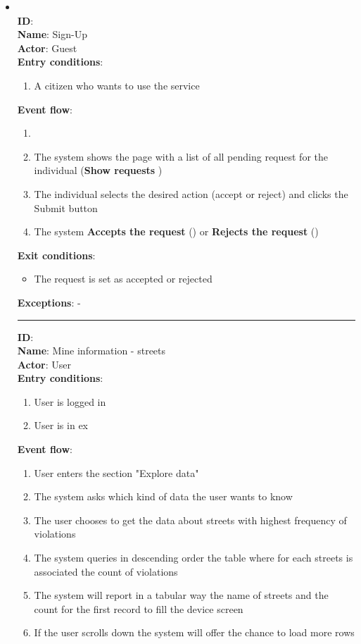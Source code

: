 \begin{enumerate}
\begin{itemize}
		\item{  } \\
		\textbf{ID}:  \\
		\textbf{Name}: Sign-Up \\
		\textbf{Actor}: Guest \\
		\textbf{Entry conditions}:
		\begin{enumerate}
			\item{A citizen who wants to use the service}
		\end{enumerate}
		\textbf{Event flow}:
		\begin{enumerate}
			\item{}
			\item{The system shows the page with a list of all pending request for the individual (\textbf{Show requests} )}
			\item{The individual selects the desired action (accept or reject) and clicks the Submit button}
			\item{The system \textbf{Accepts the request} () or \textbf{Rejects the request} ()}
		\end{enumerate}
		\textbf{Exit conditions}:
		\begin{itemize}
			\item{The request is set as accepted or rejected}
		\end{itemize}
		\textbf{Exceptions}: - \\
		\rule{\linewidth}{0.4pt}
		\textbf{ID}:  \\
		\textbf{Name}: Mine information - streets \\
		\textbf{Actor}: User  \\
		\textbf{Entry conditions}:
		\begin{enumerate}
			\item{User is logged in}
			\item{User is in ex}
		\end{enumerate}
		\textbf{Event flow}:
		\begin{enumerate}
			\item{User enters the section "Explore data"}
			\item{The system asks which kind of data the user wants to know}
      \item{The user chooses to get the data about streets with highest frequency of violations}
      \item{The system queries in descending order the table where for each streets is associated the count of violations }
      \item{The system will report in a tabular way the name of streets and the count for the first record to fill the device screen }
      \item{If the user scrolls down the system will offer the chance to load more rows}



\end{enumerate}
\end{itemize}
\end{enumerate}
